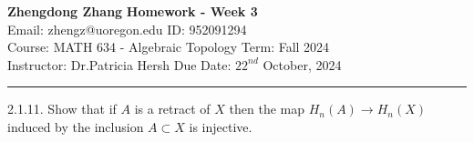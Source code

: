 \documentclass[a4paper, 11pt]{article}
\begin{document}
\noindent
\large\textbf{Zhengdong Zhang} \hfill \textbf{Homework - Week 3}   \\
Email: zhengz@uoregon.edu \hfill ID: 952091294 \\
\normalsize Course: MATH 634 - Algebraic Topology  \hfill Term: Fall 2024\\
Instructor: Dr.Patricia Hersh \hfill Due Date: $22^{nd}$ October, 2024 \\
\noindent\rule{7in}{2.8pt}
\begin{problem}{2.1.11.}
Show that if \(A\) is a retract of \(X\) then the map \(H_n(A)\rightarrow H_n(X)\) induced by the inclusion \(A\subset X\) is injective.
\end{problem}
\end{document}
